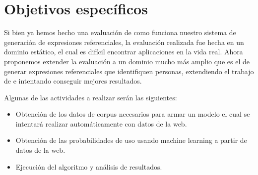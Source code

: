 \section{Objetivos espec\'ificos}
\label{objetivos}

Si bien ya hemos hecho una evaluaci\'on de como funciona nuestro sistema de generaci\'on de expresiones referenciales, la evaluaci\'on realizada 
fue hecha en un dominio est\'atico, el cual es dif\'icil encontrar aplicaciones en la vida real. Ahora proponemos
extender la evaluaci\'on a un dominio mucho m\'as amplio que es el de generar expresiones referenciales que identifiquen personas, extendiendo el
trabajo de \cite{PachecoDuboue} e intentando conseguir mejores resultados.


Algunas de las actividades a realizar ser\'an las siguientes:
\begin{itemize}

\item Obtenci\'on de los datos de corpus necesarios para armar un modelo el cual se intentar\'a realizar autom\'aticamente con datos de la web.
\item Obtenci\'on de las probabilidades de uso usando machine learning a partir de datos de la web.
\item Ejecuci\'on del algoritmo y an\'alisis de resultados.
\end{itemize}
